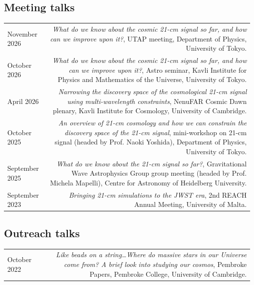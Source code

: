 \documentclass{article}
\begin{document}
\subsection*{Meeting talks}
\begin{longtable}{L!{\vrule}R}

    November 2026 & \textit{What do we know about the cosmic 21-cm signal so far, and how can we improve upon it?}, UTAP meeting, Department of Physics, University of Tokyo. \\

    October 2026 & \textit{What do we know about the cosmic 21-cm signal so far, and how can we improve upon it?}, Astro seminar, Kavli Institute for Physics and Mathematics of the Universe, University of Tokyo. \\

    April 2026 & \textit{Narrowing the discovery space of the cosmological 21-cm signal using multi-wavelength constraints}, NenuFAR Cosmic Dawn plenary, Kavli Institute for Cosmology, University of Cambridge. \\

    October 2025 & \textit{An overview of 21-cm cosmology and how we can constrain the discovery space of the 21-cm signal}, mini-workshop on 21-cm signal (headed by Prof. Naoki Yoshida), Department of Physics, University of Tokyo. \\

    September 2025 & \textit{What do we know about the 21-cm signal so far?}, Gravitational Wave Astrophysics Group group meeting (headed by Prof. Michela Mapelli), Centre for Astronomy of Heidelberg University. \\

    September 2023 & \textit{Bringing 21-cm simulations to the JWST era}, 2nd REACH Annual Meeting, University of Malta. \\

\end{longtable}

\subsection*{Outreach talks}
\begin{longtable}{L!{\vrule}R}

    October 2022 & \textit{Like beads on a string\ldots Where do massive stars in our Universe come from? A brief look into studying our cosmos}, Pembroke Papers, Pembroke College, University of Cambridge. \\

\end{longtable}
\end{document}
